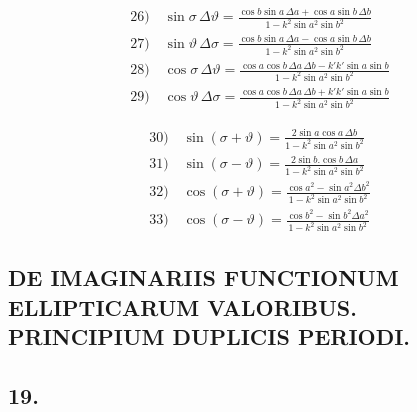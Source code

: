 \documentclass{article}
\begin{document}
\[\begin{gathered}
\text{26)}\quad\sin\sigma\,\Delta\vartheta=\frac{\cos b\sin a\,\Delta a+\cos a\sin b\,\Delta b}{1-k^{2}\sin a^{2}\sin b^{2}}\\[1ex]
\text{27)}\quad\sin\vartheta\,\Delta\sigma=\frac{\cos b\sin a\,\Delta a-\cos a\sin b\,\Delta b}{1-k^{2}\sin a^{2}\sin b^{2}}\\[1ex]
\text{28)}\quad\cos\sigma\,\Delta\vartheta=\frac{\cos a\cos b\,\Delta a\,\Delta b-k'k'\sin a\sin b}{1-k^{2}\sin a^{2}\sin b^{2}}\\[1ex]
\text{29)}\quad\cos\vartheta\,\Delta\sigma=\frac{\cos a\cos b\,\Delta a\,\Delta b+k'k'\sin a\sin b}{1-k^{2}\sin a^{2}\sin b^{2}}
\end{gathered}
\]

\[
\begin{gathered}
\text{30)}\quad\sin(\sigma+\vartheta)=\frac{2\sin a\cos a\,\Delta b}{1-k^{2}\sin a^{2}\sin b^{2}}\\[1ex]
\text{31)}\quad\sin(\sigma-\vartheta)=\frac{2\sin b.\cos b\,\Delta a}{1-k^{2}\sin a^{2}\sin b^{2}}\\[1ex]
\text{32)}\quad\cos(\sigma+\vartheta)=\frac{\cos a^{2}-\sin a^{2}\Delta b^{2}}{1-k^{2}\sin a^{2}\sin b^{2}}\\[1ex]
\text{33)}\quad\cos(\sigma-\vartheta)=\frac{\cos b^{2}-\sin b^{2}\Delta a^{2}}{1-k^{2}\sin a^{2}\sin b^{2}}
\end{gathered}
\]

\subsection*{DE IMAGINARIIS FUNCTIONUM ELLIPTICARUM VALORIBUS. PRINCIPIUM DUPLICIS PERIODI.}

\subsection*{19.}
\end{document}
